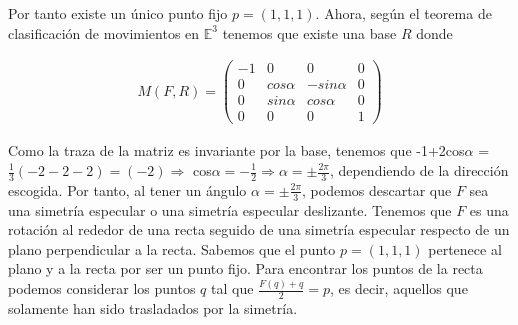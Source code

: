 Por tanto existe un único punto fijo $p = (1,1,1)$. Ahora, según el teorema de clasificación de movimientos en $\mathbb{E}^3$ tenemos que existe una base $R$ donde

\begin{gather*}
    M(F,R) = 
    \begin{pmatrix}
    -1 & 0 & 0 & 0\\
    0 & cos\alpha & -sin\alpha & 0\\
    0 & sin\alpha & cos\alpha & 0\\
    0 & 0 & 0 & 1
    \end{pmatrix}
\end{gather*}

Como la traza de la matriz es invariante por la base, tenemos que -1+2cos$\alpha$ = $\frac{1}{3}(-2-2-2) = (-2) \Longrightarrow$ cos$\alpha = -\frac{1}{2} \Longrightarrow \alpha = \pm \frac{2\pi}{3}$, dependiendo de la dirección escogida. Por tanto, al tener un ángulo $\alpha = \pm \frac{2\pi}{3}$, podemos descartar que $F$ sea una simetría especular o una simetría especular deslizante. Tenemos que $F$ es una rotación al rededor de una recta seguido de una simetría especular respecto de un plano perpendicular a la recta. Sabemos que el punto $p = (1,1,1)$ pertenece al plano y a la recta por ser un punto fijo. Para encontrar los puntos de la recta podemos considerar los puntos $q$ tal que $\frac{F(q) + q}{2} = p$, es decir, aquellos que solamente han sido trasladados por la simetría. 

